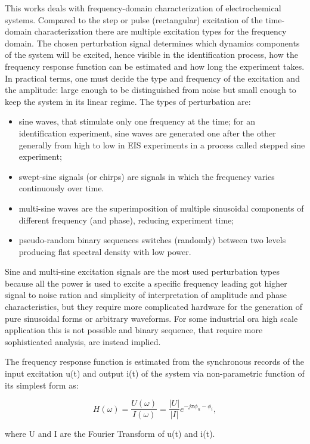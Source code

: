 This works deals with frequency-domain characterization of electrochemical systems. Compared to the step or pulse (rectangular) excitation of the time-domain characterization there are multiple excitation types for the frequency domain. The chosen perturbation signal determines which dynamics components of the system will be excited, hence visible in the identification process, how the frequency response function can be estimated and how long the experiment takes. In practical terms, one must decide the type and frequency of the excitation and the amplitude: large enough to be distinguished from noise but small enough to keep the system in its linear regime. The types of perturbation are:
\begin{itemize}
	\item sine waves, that stimulate only one frequency at the time; for an identification experiment, sine waves are generated one after the other generally from high to low in EIS experiments in a process called stepped sine experiment;
	\item swept-sine signals (or chirps) are signals in which the frequency varies continuously over time.
	\item multi-sine waves are the superimposition of multiple sinusoidal components of different frequency (and phase), reducing experiment time;
	\item pseudo-random binary sequences switches (randomly) between two levels producing flat spectral density with low power.
\end{itemize}

Sine and multi-sine excitation signals are the most used perturbation types because all the power is used to excite a specific frequency leading got higher signal to noise ration and simplicity of interpretation of amplitude and phase characteristics, but they require more complicated hardware for the generation of pure sinusoidal forms or arbitrary waveforms. For some industrial ora high scale application this is not possible and binary sequence, that require more sophisticated analysis, are instead implied.

The frequency response function is estimated from the synchronous records of the input excitation u(t) and output i(t) of the system via non-parametric function of its simplest form as:

$$
H(\omega) = \frac{U(\omega)}{I(\omega)}=\frac{|U|}{|I|}e^{-j\pi\phi_u-\phi_i},
$$

where U and I are the Fourier Transform of u(t) and i(t).

